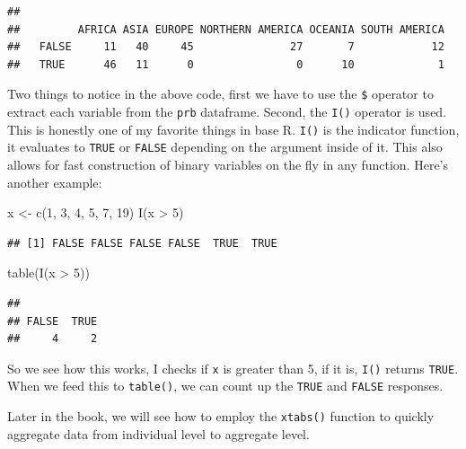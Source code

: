 \documentclass[
]{book}
\newenvironment{Shaded}{\begin{snugshade}}{\end{snugshade}}
\newcommand{\DecValTok}[1]{\textcolor[rgb]{0.00,0.00,0.81}{#1}}
\newcommand{\FunctionTok}[1]{\textcolor[rgb]{0.00,0.00,0.00}{#1}}
\newcommand{\NormalTok}[1]{#1}
\newcommand{\OtherTok}[1]{\textcolor[rgb]{0.56,0.35,0.01}{#1}}
\newcommand{\SpecialCharTok}[1]{\textcolor[rgb]{0.00,0.00,0.00}{#1}}
\begin{document}
\begin{verbatim}
##        
##         AFRICA ASIA EUROPE NORTHERN AMERICA OCEANIA SOUTH AMERICA
##   FALSE     11   40     45               27       7            12
##   TRUE      46   11      0                0      10             1
\end{verbatim}

Two things to notice in the above code, first we have to use the \texttt{\$}
operator to extract each variable from the \texttt{prb} dataframe. Second, the
\texttt{I()} operator is used. This is honestly one of my favorite things in
base R. \texttt{I()} is the indicator function, it evaluates to \texttt{TRUE} or
\texttt{FALSE} depending on the argument inside of it. This also allows for
fast construction of binary variables on the fly in any function. Here's
another example:

\begin{Shaded}
\begin{Highlighting}[]
\NormalTok{x }\OtherTok{\textless{}{-}} \FunctionTok{c}\NormalTok{(}\DecValTok{1}\NormalTok{, }\DecValTok{3}\NormalTok{, }\DecValTok{4}\NormalTok{, }\DecValTok{5}\NormalTok{, }\DecValTok{7}\NormalTok{, }\DecValTok{19}\NormalTok{)}
\FunctionTok{I}\NormalTok{(x }\SpecialCharTok{\textgreater{}} \DecValTok{5}\NormalTok{)}
\end{Highlighting}
\end{Shaded}

\begin{verbatim}
## [1] FALSE FALSE FALSE FALSE  TRUE  TRUE
\end{verbatim}

\begin{Shaded}
\begin{Highlighting}[]
\FunctionTok{table}\NormalTok{(}\FunctionTok{I}\NormalTok{(x }\SpecialCharTok{\textgreater{}} \DecValTok{5}\NormalTok{))}
\end{Highlighting}
\end{Shaded}

\begin{verbatim}
## 
## FALSE  TRUE 
##     4     2
\end{verbatim}

So we see how this works, I checks if \texttt{x} is greater than 5, if it is,
\texttt{I()} returns \texttt{TRUE}. When we feed this to \texttt{table()}, we can count up
the \texttt{TRUE} and \texttt{FALSE} responses.

Later in the book, we will see how to employ the \texttt{xtabs()} function to
quickly aggregate data from individual level to aggregate level.
\end{document}
